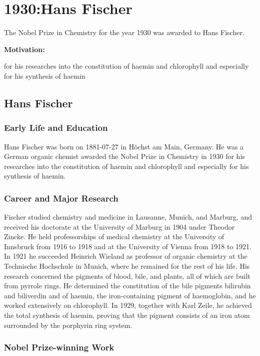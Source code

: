\chapter{1930:Hans Fischer}

\label{chap:chemistry1930}

The Nobel Prize in Chemistry for the year 1930 was awarded to Hans Fischer.

\textbf{Motivation:}

for his researches into the constitution of haemin and chlorophyll and especially for his synthesis of haemin

\section{Hans Fischer}

\subsection*{Early Life and Education}

Hans Fischer was born on 1881-07-27 in Höchst am Main, Germany.
He was a German organic chemist awarded the Nobel Prize in Chemistry in 1930 for his researches into the constitution of haemin and chlorophyll and especially for his synthesis of haemin.

\subsection*{Career and Major Research}

Fischer studied chemistry and medicine in Lausanne, Munich, and Marburg, and received his doctorate at the University of Marburg in 1904 under Theodor Zincke.
He held professorships of medical chemistry at the University of Innsbruck from 1916 to 1918 and at the University of Vienna from 1918 to 1921.
In 1921 he succeeded Heinrich Wieland as professor of organic chemistry at the Technische Hochschule in Munich, where he remained for the rest of his life.
His research concerned the pigments of blood, bile, and plants, all of which are built from pyrrole rings.
He determined the constitution of the bile pigments bilirubin and biliverdin and of haemin, the iron-containing pigment of haemoglobin, and he worked extensively on chlorophyll.
In 1929, together with Karl Zeile, he achieved the total synthesis of haemin, proving that the pigment consists of an iron atom surrounded by the porphyrin ring system.

\subsection*{Nobel Prize-winning Work}


